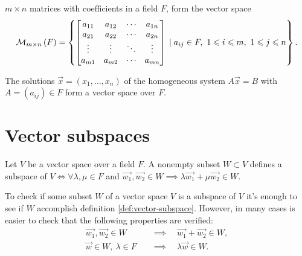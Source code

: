 \begin{example}
    $m\times n$ matrices with coefficients in a field $F$, form the vector space
    \begin{equation}
        \mathcal{M}_{m\times n}\left( F \right) = \left\{
            \begin{bmatrix}
                a_{11} & a_{12} & \cdots & a_{1n} \\
                a_{21} & a_{22} & \cdots & a_{2n} \\
                \vdots & \vdots & \ddots & \vdots \\
                a_{m1} & a_{m2} & \cdots & a_{mn}
            \end{bmatrix} \; | \; a_{ij}\in F,\ 1 \leqslant i \leqslant m,\ 1\leqslant j\leqslant n
        \right\}.
    \end{equation}
\end{example}

\begin{example}
    The solutions $\vec{x} = \left( x_1, \ldots, x_n \right) $ of the homogeneous system $A\vec{x} = B$
    with $A = \left( a_{ij} \right) \in F$ form a vector space over $F$.
\end{example}

\section{Vector subspaces}
\begin{defn} \label{def:vector-subspace}
    Let $V$ be a vector space over a field $F$. A nonempty subset $W\subset V$ defines a subspace of $V
    \iff \forall \lambda, \mu\in F$ and $\vec{w_1}, \vec{w_2}\in W\implies \lambda\vec{w_1} +
        \mu\vec{w_2}\in W$.
\end{defn}

To check if some subset $W$ of a vector space $V$ is a subspace of $V$ it's enough to see if $W$ accomplish
definition \ref{def:vector-subspace}. However, in many cases is easier to check that the following properties
are verified:
\begin{align} \label{prop:vector-subspace-2}
    \vec{w_1}, \vec{w_2}\in W &\quad\implies\quad \vec{w_1} + \vec{w_2}\in W, \\
    \vec{w}\in W,\ \lambda\in F&\quad\implies\quad \lambda\vec{w}\in W.
\end{align}

